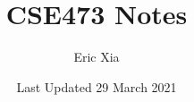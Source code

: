 \documentclass{article}
\title{CSE473 Notes}
\author{Eric Xia}
\date{Last Updated 29 March 2021}
\begin{document}
    \maketitle
    \tableofcontents
    \pagebreak

\end{document}
